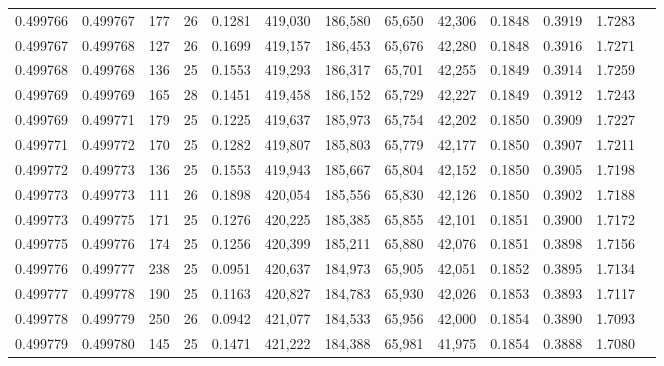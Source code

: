 \begin{tabular}{rrrrrrrrrrrrr}
0.499766 & 0.499767 & 177 &  26 &                                     0.1281 & 419,030 & 186,580 &  65,650 &  42,306 & 0.1848 & 0.3919 & 1.7283 \\
0.499767 & 0.499768 & 127 &  26 &                                     0.1699 & 419,157 & 186,453 &  65,676 &  42,280 & 0.1848 & 0.3916 & 1.7271 \\
0.499768 & 0.499768 & 136 &  25 &                                     0.1553 & 419,293 & 186,317 &  65,701 &  42,255 & 0.1849 & 0.3914 & 1.7259 \\
0.499769 & 0.499769 & 165 &  28 &                                     0.1451 & 419,458 & 186,152 &  65,729 &  42,227 & 0.1849 & 0.3912 & 1.7243 \\
0.499769 & 0.499771 & 179 &  25 &                                     0.1225 & 419,637 & 185,973 &  65,754 &  42,202 & 0.1850 & 0.3909 & 1.7227 \\
0.499771 & 0.499772 & 170 &  25 &                                     0.1282 & 419,807 & 185,803 &  65,779 &  42,177 & 0.1850 & 0.3907 & 1.7211 \\
0.499772 & 0.499773 & 136 &  25 &                                     0.1553 & 419,943 & 185,667 &  65,804 &  42,152 & 0.1850 & 0.3905 & 1.7198 \\
0.499773 & 0.499773 & 111 &  26 &                                     0.1898 & 420,054 & 185,556 &  65,830 &  42,126 & 0.1850 & 0.3902 & 1.7188 \\
0.499773 & 0.499775 & 171 &  25 &                                     0.1276 & 420,225 & 185,385 &  65,855 &  42,101 & 0.1851 & 0.3900 & 1.7172 \\
0.499775 & 0.499776 & 174 &  25 &                                     0.1256 & 420,399 & 185,211 &  65,880 &  42,076 & 0.1851 & 0.3898 & 1.7156 \\
0.499776 & 0.499777 & 238 &  25 &                                     0.0951 & 420,637 & 184,973 &  65,905 &  42,051 & 0.1852 & 0.3895 & 1.7134 \\
0.499777 & 0.499778 & 190 &  25 &                                     0.1163 & 420,827 & 184,783 &  65,930 &  42,026 & 0.1853 & 0.3893 & 1.7117 \\
0.499778 & 0.499779 & 250 &  26 &                                     0.0942 & 421,077 & 184,533 &  65,956 &  42,000 & 0.1854 & 0.3890 & 1.7093 \\
0.499779 & 0.499780 & 145 &  25 &                                     0.1471 & 421,222 & 184,388 &  65,981 &  41,975 & 0.1854 & 0.3888 & 1.7080 \\

\end{tabular}
